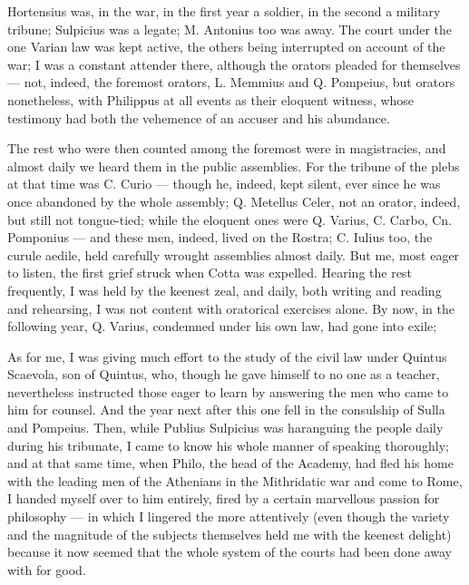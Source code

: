  Hortensius was, in the war, in the first year a soldier, in the second a military tribune; Sulpicius was a legate; M. Antonius too was away. The court under the one Varian law was kept active, the others being interrupted on account of the war; I was a constant attender there, although the orators pleaded for themselves — not, indeed, the foremost orators, L. Memmius and Q. Pompeius, but orators nonetheless, with Philippus at all events as their eloquent witness, whose testimony had both the vehemence of an accuser and his abundance.

 The rest who were then counted among the foremost were in magistracies, and almost daily we heard them in the public assemblies. For the tribune of the plebs at that time was C. Curio — though he, indeed, kept silent, ever since he was once abandoned by the whole assembly; Q. Metellus Celer, not an orator, indeed, but still not tongue-tied; while the eloquent ones were Q. Varius, C. Carbo, Cn. Pomponius — and these men, indeed, lived on the Rostra; C. Iulius too, the curule aedile, held carefully wrought assemblies almost daily. But me, most eager to listen, the first grief struck when Cotta was expelled. Hearing the rest frequently, I was held by the keenest zeal, and daily, both writing and reading and rehearsing, I was not content with oratorical exercises alone. By now, in the following year, Q. Varius, condemned under his own law, had gone into exile;

 As for me, I was giving much effort to the study of the civil law under Quintus Scaevola, son of Quintus, who, though he gave himself to no one as a teacher, nevertheless instructed those eager to learn by answering the men who came to him for counsel. And the year next after this one fell in the consulship of Sulla and Pompeius. Then, while Publius Sulpicius was haranguing the people daily during his tribunate, I came to know his whole manner of speaking thoroughly; and at that same time, when Philo, the head of the Academy, had fled his home with the leading men of the Athenians in the Mithridatic war and come to Rome, I handed myself over to him entirely, fired by a certain marvellous passion for philosophy — in which I lingered the more attentively (even though the variety and the magnitude of the subjects themselves held me with the keenest delight) because it now seemed that the whole system of the courts had been done away with for good.

